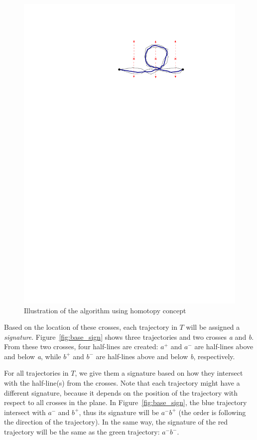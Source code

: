 \begin{figure}
\centering
\includegraphics[scale=1]{Gambar/homotopy}
\caption[Illustration of the algorithm using homotopy concept]{Illustration of the algorithm using homotopy concept} 
\label{fig:homotopy}
\end{figure}

Based on the location of these crosses, each trajectory in $T$ will be assigned a \textit{signature}.
Figure~\ref{fig:base_sign} shows three trajectories and two crosses \textit{a} and \textit{b}. 
From these two crosses, four half-lines are created: \textit{$a^{+}$} and \textit{$a^{-}$} are half-lines above and below \textit{a}, while \textit{$b^{+}$} and \textit{$b^{-}$} are half-lines above and below \textit{b}, respectively. 

For all trajectories in $T$, we give them a signature based on how they intersect with the half-line(s) from the crosses. 
Note that each trajectory might have a different signature, because it depends on the position of the trajectory with respect to all crosses in the plane.
In Figure~\ref{fig:base_sign}, the blue trajectory intersect with \textit{$a^{-}$} and \textit{$b^{+}$}, thus its signature will be \textit{$a^{-}b^{+}$} (the order is following the direction of the trajectory). 
In the same way, the signature of the red trajectory will be the same as the green trajectory: \textit{$a^{-}b^{-}$}.

